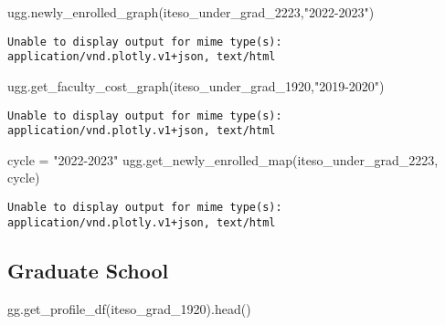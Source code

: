 \documentclass[
  letterpaper,
  DIV=11,
  numbers=noendperiod]{scrartcl}
\newenvironment{Shaded}{\begin{snugshade}}{\end{snugshade}}
\newcommand{\NormalTok}[1]{\textcolor[rgb]{0.00,0.23,0.31}{#1}}
\newcommand{\OperatorTok}[1]{\textcolor[rgb]{0.37,0.37,0.37}{#1}}
\newcommand{\StringTok}[1]{\textcolor[rgb]{0.13,0.47,0.30}{#1}}
\begin{document}
\begin{Shaded}
\begin{Highlighting}[]
\NormalTok{ugg.newly\_enrolled\_graph(iteso\_under\_grad\_2223,}\StringTok{"2022{-}2023"}\NormalTok{)}
\end{Highlighting}
\end{Shaded}

\begin{verbatim}
Unable to display output for mime type(s): application/vnd.plotly.v1+json, text/html
\end{verbatim}

\begin{Shaded}
\begin{Highlighting}[]
\NormalTok{ugg.get\_faculty\_cost\_graph(iteso\_under\_grad\_1920,}\StringTok{"2019{-}2020"}\NormalTok{)}
\end{Highlighting}
\end{Shaded}

\begin{verbatim}
Unable to display output for mime type(s): application/vnd.plotly.v1+json, text/html
\end{verbatim}

\begin{Shaded}
\begin{Highlighting}[]
\NormalTok{cycle }\OperatorTok{=} \StringTok{"2022{-}2023"}
\NormalTok{ugg.get\_newly\_enrolled\_map(iteso\_under\_grad\_2223, cycle)}
\end{Highlighting}
\end{Shaded}

\begin{verbatim}
Unable to display output for mime type(s): application/vnd.plotly.v1+json, text/html
\end{verbatim}

\subsection{Graduate School}\label{graduate-school}

\begin{Shaded}
\begin{Highlighting}[]
\NormalTok{gg.get\_profile\_df(iteso\_grad\_1920).head()}
\end{Highlighting}
\end{Shaded}
\end{document}
